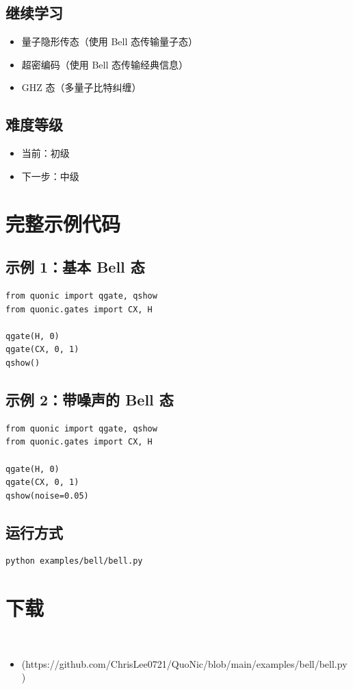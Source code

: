 \documentclass[12pt,a4paper]{article}
\begin{document}
\subsection{继续学习}
\begin{itemize}
  \item 量子隐形传态（使用 Bell 态传输量子态）
  \item 超密编码（使用 Bell 态传输经典信息）
  \item GHZ 态（多量子比特纠缠）
\end{itemize}

\subsection{难度等级}
\begin{itemize}
  \item 当前：初级
  \item 下一步：中级
\end{itemize}

\section{完整示例代码}

\subsection{示例 1：基本 Bell 态}

\begin{lstlisting}[style=python]
from quonic import qgate, qshow
from quonic.gates import CX, H

qgate(H, 0)
qgate(CX, 0, 1)
qshow()
\end{lstlisting}

\subsection{示例 2：带噪声的 Bell 态}

\begin{lstlisting}[style=python]
from quonic import qgate, qshow
from quonic.gates import CX, H

qgate(H, 0)
qgate(CX, 0, 1)
qshow(noise=0.05)
\end{lstlisting}

\subsection{运行方式}

\begin{verbatim}
python examples/bell/bell.py
\end{verbatim}


\section{下载}

\begin{itemize}
  \item [bell.py](https://github.com/ChrisLee0721/QuoNic/blob/main/examples/bell/bell.py)
\end{itemize}
\end{document}
